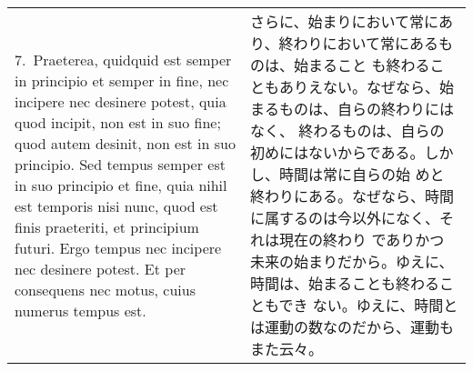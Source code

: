 \documentclass[10pt]{jsarticle} %
\begin{document}
%
%
%


\begin{longtable}{p{21em}p{21em}}

7.~{\sc Praeterea}, quidquid est semper in principio et semper in fine, nec
 incipere nec desinere potest, quia quod incipit, non est in suo fine;
 quod autem desinit, non est in suo principio. Sed tempus semper est in
 suo principio et fine, quia nihil est temporis nisi nunc, quod est
 finis praeteriti, et principium futuri. Ergo tempus nec incipere nec
 desinere potest. Et per consequens nec motus, cuius numerus tempus est.

&
さらに、始まりにおいて常にあり、終わりにおいて常にあるものは、始まること
 も終わることもありえない。なぜなら、始まるものは、自らの終わりにはなく、
 終わるものは、自らの初めにはないからである。しかし、時間は常に自らの始
 めと終わりにある。なぜなら、時間に属するのは今以外になく、それは現在の終わり
 でありかつ未来の始まりだから。ゆえに、時間は、始まることも終わることもでき
 ない。ゆえに、時間とは運動の数なのだから、運動もまた云々。

\end{longtable}
%
%
%
%
\end{document}

